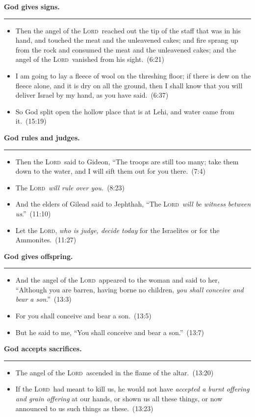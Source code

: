 \documentclass{article}
\newcommand{\godcategory}[1]{\bigskip\noindent \textbf{#1}\smallskip\hrule\nopagebreak}
\newcommand{\Lord}{\textsc{Lord}}
\begin{document}
\begin{landscape}
\begin{multicols}{3}
\godcategory{God gives signs.}
\begin{itemize}
  \item Then the angel of the \Lord\ reached out the tip of the staff that was in his hand, and touched the meat and the unleavened cakes; and fire sprang up from the rock and consumed the meat and the unleavened cakes; and the angel of the \Lord\ vanished from his sight.~(6:21)
  \item I am going to lay a fleece of wool on the threshing floor; if there is dew on the fleece alone, and it is dry on all the ground, then I shall know that you will deliver Israel by my hand, as you have said.~(6:37)
  \item So God split open the hollow place that is at Lehi, and water came from it.~(15:19)
\end{itemize}

\godcategory{God rules and judges.}
\begin{itemize}
  \item Then the \Lord\ said to Gideon, “The troops are still too many; take them down to the water, and I will sift them out for you there.~(7:4)
  \item The \Lord\ \emph{will rule over you.}~(8:23)
  \item And the elders of Gilead said to Jephthah, “The \Lord\ \emph{will be witness between us}.”~(11:10)
  \item Let the \Lord, \emph{who is judge, decide today} for the Israelites or for the Ammonites.~(11:27)
\end{itemize}

\clearpage

\godcategory{God gives offspring.}
\begin{itemize}
  \item And the angel of the \Lord\ appeared to the woman and said to her, “Although you are barren, having borne no children, \emph{you shall conceive and bear a son}.”~(13:3)
  \item For you shall conceive and bear a son.~(13:5)
  \item But he said to me, “You shall conceive and bear a son.”~(13:7)
\end{itemize}

\godcategory{God accepts sacrifices.}
\begin{itemize}
  \item The angel of the \Lord\ ascended in the flame of the altar.~(13:20)
  \item If the \Lord\ had meant to kill us, he would not have \emph{accepted a burnt offering and grain offering} at our hands, or shown us all these things, or now announced to us such things as these.~(13:23)
\end{itemize}


\end{multicols}
\end{landscape}
\end{document}
